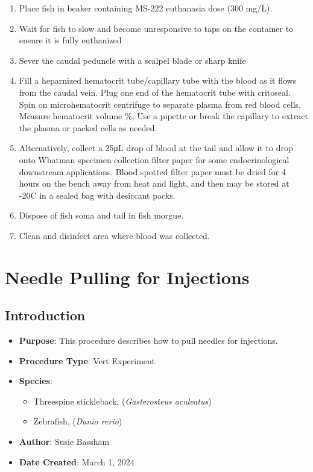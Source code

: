\documentclass[
  letterpaper,
  DIV=11,
  numbers=noendperiod]{scrreprt}
\providecommand{\tightlist}{%
  \setlength{\itemsep}{0pt}\setlength{\parskip}{0pt}}\usepackage{longtable,booktabs,array}
\begin{document}
\begin{enumerate}
\def\labelenumi{\arabic{enumi}.}
\tightlist
\item
  Place fish in beaker containing MS-222 euthanasia dose (300 mg/L).
\item
  Wait for fish to slow and become unresponsive to taps on the container
  to ensure it is fully euthanized
\item
  Sever the caudal peduncle with a scalpel blade or sharp knife
\item
  Fill a heparnized hematocrit tube/capillary tube with the blood as it
  flows from the caudal vein. Plug one end of the hematocrit tube with
  critoseal. Spin on microhematocrit centrifuge to separate plasma from
  red blood cells. Measure hematocrit volume \%, Use a pipette or break
  the capillary to extract the plasma or packed cells as needed.
\item
  Alternatively, collect a 25μL drop of blood at the tail and allow it
  to drop onto Whatman specimen collection filter paper for some
  endocrinological downstream applications. Blood spotted filter paper
  must be dried for 4 hours on the bench away from heat and light, and
  then may be stored at -20C in a sealed bag with desiccant packs.
\item
  Dispose of fish soma and tail in fish morgue.
\item
  Clean and disinfect area where blood was collected.
\end{enumerate}

\hypertarget{sec-vertexp_needle_pulling}{%
\chapter{Needle Pulling for
Injections}\label{sec-vertexp_needle_pulling}}

\hypertarget{introduction-47}{%
\section{Introduction}\label{introduction-47}}

\begin{itemize}
\tightlist
\item
  \textbf{Purpose}: This procedure describes how to pull needles for
  injections.
\item
  \textbf{Procedure Type}: Vert Experiment
\item
  \textbf{Species}:

  \begin{itemize}
  \tightlist
  \item
    Threespine stickleback, (\emph{Gasterosteus aculeatus})
  \item
    Zebrafish, (\emph{Danio rerio})
  \end{itemize}
\item
  \textbf{Author}: Susie Bassham
\item
  \textbf{Date Created}: March 1, 2024
\end{itemize}
\end{document}
